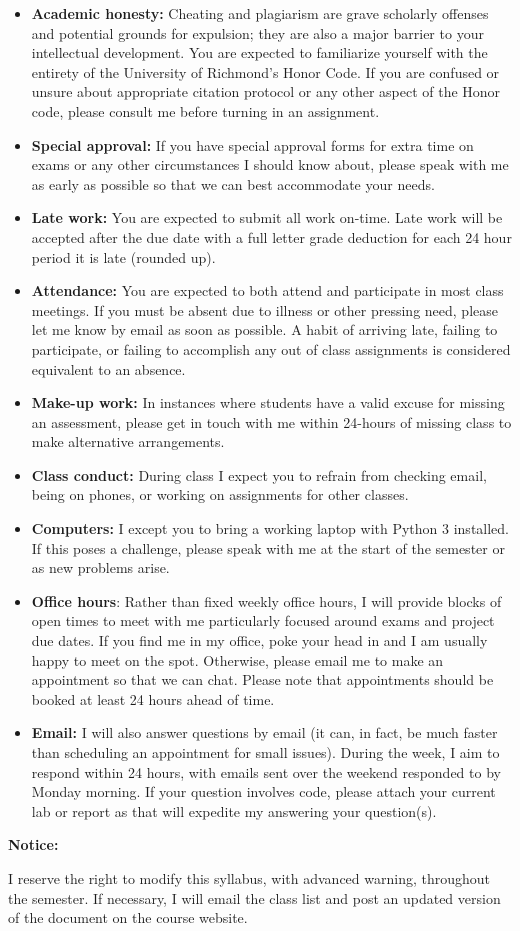 \documentclass[12pt]{article}
\begin{document}
\begin{itemize}\setlength\itemsep{0em}
\item \textbf{Academic honesty:} Cheating and plagiarism are grave scholarly
offenses and potential grounds
for expulsion; they are also a major barrier to your intellectual development.
You are expected to familiarize yourself with the entirety of the
University of Richmond’s Honor Code. If you are confused or unsure about
appropriate citation protocol or any other aspect of the Honor code,
please consult me before turning in an assignment.
\item \textbf{Special approval:} If you have special approval forms for extra
time on exams or any other circumstances I should know about, please speak
with me as early as possible so that we can best accommodate your needs.
\item \textbf{Late work:} You are expected to submit all work on-time. Late 
work will be accepted after the due date with a full letter grade deduction for
each 24 hour period it is late (rounded up).
\item \textbf{Attendance:} You are expected to both attend and participate in most
class meetings. If you must be absent due to illness or other pressing
need, please let me know by email as soon as possible. A habit of arriving
late, failing to participate, or failing to accomplish any out of class assignments
is considered equivalent to an absence.
\item \textbf{Make-up work:} In instances where students have a valid excuse for
missing an assessment, please get in touch with me within 24-hours of missing
class to make alternative arrangements.
\item \textbf{Class conduct:} During class I expect you to refrain from checking
email, being on phones, or working on assignments for other classes.
\item \textbf{Computers:} I except you to bring a working laptop with Python
3 installed. If this poses a challenge, please speak with me at the 
start of the semester or as new problems arise.
\item \textbf{Office hours}: Rather than fixed weekly office hours, I will 
provide blocks of open times to meet with me particularly focused around
exams and project due dates. If you find me in my office, poke your head in
and I am usually happy to meet on the spot. Otherwise, please email me to make
an appointment so that we can chat. Please note that appointments should
be booked at least 24 hours ahead of time.
\item \textbf{Email:} I will also answer questions by email (it can, in fact,
be much faster than scheduling an appointment for small issues). During the
week, I aim to respond within 24 hours, with emails sent over the weekend
responded to by Monday morning. If your question involves code, please attach
your current lab or report as that will expedite my answering your question(s).
\end{itemize}

\bigskip

\textbf{Notice:} \vspace{6pt}

I reserve the right to modify this syllabus, with advanced warning, throughout
the semester. If necessary, I will email the class list and post an updated
version of the document on the course website.
\end{document}
